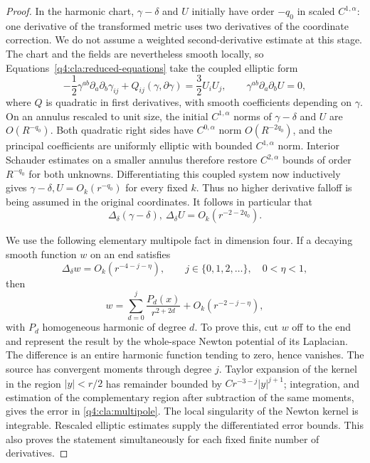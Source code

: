 \begin{proof}
In the harmonic chart, $\gamma-\delta$ and $U$ initially have order
$-q_0$ in scaled $C^{1,\alpha}$: one derivative of the transformed
metric uses two derivatives of the coordinate correction.  We do not
assume a weighted second-derivative estimate at this stage.  The chart
and the fields are nevertheless smooth locally, so
Equations~\eqref{q4:cla:reduced-equations}
take the coupled elliptic form
\begin{equation}\label{q4:cla:harmonic-system}
 -\frac12\gamma^{ab}\partial_a\partial_b\gamma_{ij}
       +Q_{ij}(\gamma,\partial\gamma)
       =\frac32 U_iU_j,
 \qquad \gamma^{ab}\partial_a\partial_bU=0,
\end{equation}
where $Q$ is quadratic in first derivatives, with smooth coefficients
depending on $\gamma$.  On an annulus rescaled to unit size, the initial
$C^{1,\alpha}$ norms of $\gamma-\delta$ and $U$ are $O(R^{-q_0})$.
Both quadratic right sides have $C^{0,\alpha}$ norm $O(R^{-2q_0})$,
and the principal coefficients are uniformly elliptic with bounded
$C^{1,\alpha}$ norm.  Interior Schauder estimates on a smaller annulus
therefore restore $C^{2,\alpha}$ bounds of order $R^{-q_0}$ for both
unknowns.  Differentiating this coupled system now inductively gives
$\gamma-\delta,U=O_k(r^{-q_0})$ for every fixed $k$.
Thus no higher derivative falloff is being assumed in the original
coordinates.  It follows in particular that
\begin{equation}\label{q4:cla:first-euclidean-source}
 \Delta_\delta(\gamma-\delta),\ \Delta_\delta U
       =O_k(r^{-2-2q_0}).
\end{equation}

We use the following elementary multipole fact in dimension four.
If a decaying smooth function $w$ on an end satisfies
\[
 \Delta_\delta w=O_k(r^{-4-j-\eta}),
 \qquad j\in\{0,1,2,\ldots\},\quad 0<\eta<1,
\]
then
\begin{equation}\label{q4:cla:multipole}
 w=\sum_{d=0}^j\frac{P_d(x)}{r^{2+2d}}
       +O_k(r^{-2-j-\eta}),
\end{equation}
with $P_d$ homogeneous harmonic of degree $d$.  To prove this, cut $w$
off to the end and represent the result by the whole-space Newton
potential of its Laplacian.  The difference is an entire harmonic
function tending to zero, hence vanishes.  The source has convergent
moments through degree $j$.  Taylor expansion of the kernel in the
region $|y|<r/2$ has remainder bounded by
$C r^{-3-j}|y|^{j+1}$; integration, and estimation of the complementary
region after subtraction of the same moments, gives the error in
\eqref{q4:cla:multipole}.  The local singularity of the Newton kernel is
integrable.  Rescaled elliptic estimates supply the differentiated
error bounds.  This also proves the statement simultaneously for
each fixed finite number of derivatives.


\end{proof}
